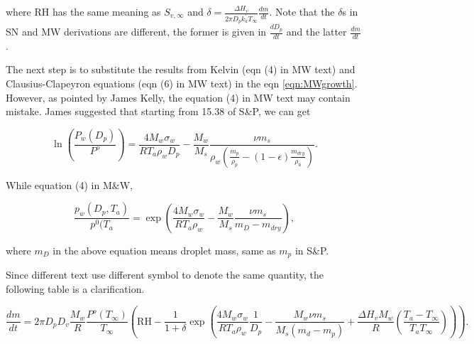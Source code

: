 \documentclass[12pt]{amsart}
\begin{document}
where RH has the same meaning as $S_{v, \infty}$ and $\delta=\frac{\Delta H_{v}}{2 \pi D_{p} k^{'}_{a} T_{\infty}} \frac{dm}{dt}$.
Note that the $\delta$s in SN and MW derivations are different, the former is given in $\frac{dD_{p}}{dt}$ and the latter $\frac{dm}{dt}$.


The next step is to substitute the results from Kelvin (eqn (4) in MW text) and Clausius-Clapeyron equations (eqn (6) in MW text) in the eqn \ref{eqn:MWgrowth}. However, as pointed by James Kelly, the equation (4) in MW text may contain mistake. James suggested that starting from 15.38 of S\&P, we can get 

\begin{equation} 
\ln(\frac{P_{w}(D_{p})}{P^{o}})=\frac{4 M_{w} \sigma_{w}}{R T_{a} \rho_{w}D_{p}}-\frac{M_{w}}{M_{s}}\frac{\nu m_{s}}{\rho_w(\frac{m_p}{\rho_p}-(1-\epsilon)\frac{m_{dry}}{\rho_u})}.
\end{equation}

While equation (4) in M\&W, 

\begin{equation}
\frac{p_{w}(D_{p}, T_{a})}{p^{0}(T_{a}}=\exp(\frac{4 M_{w} \sigma_{w}}{R T_{a} \rho_{w}}-\frac{M_{w}}{M_{s}}\frac{\nu m_{s}}{m_{D}-m_{dry}}),
\end{equation}

where $m_{D}$ in the above equation means droplet mass, same as $m_{p}$ in S\&P. 

Since different text use different symbol to denote the same quantity, the following table is a clarification.







\begin{equation}\label{eqn:22}
\frac{dm}{dt}=2 \pi D_{p} D_{v}  \frac{M_{w}}{R} \frac{P^{o}(T_{\infty})} {T_{\infty}} (\textrm{RH} - \frac{1}{1+\delta} \exp( \frac{4 M_{w}\sigma_{w}}{R T_{a} \rho_w}\frac{1}{D_{p}}-\frac{ M_{w} \nu m_{s}}{M_{s} (m_{d}-m_{p})}+\frac{\Delta H_{v} M_{w}}{R} (\frac{T_{a}-T_{\infty}}{T_{a} T_{\infty}}))).
\end{equation}
\end{document}
